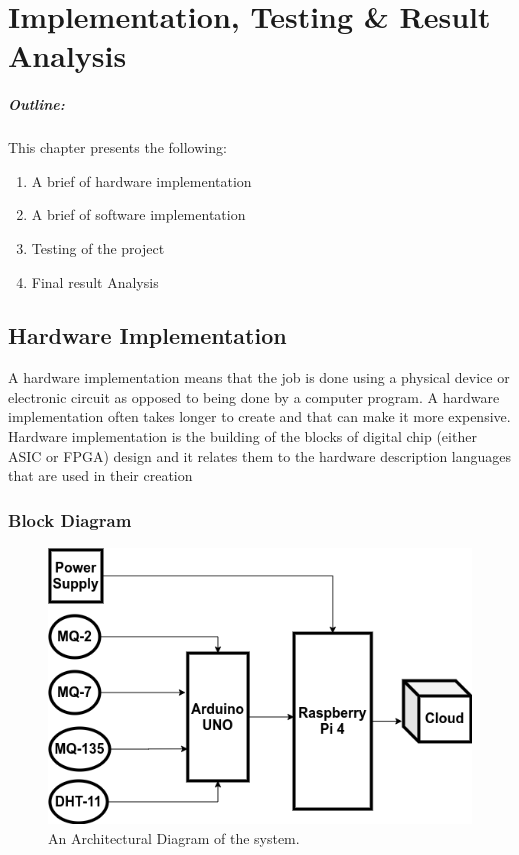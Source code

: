 

\chapter{Implementation, Testing \& Result Analysis}\label{chap4}



\vspace*{40 ex}
\paragraph*{Outline:} This chapter presents the following:
\begin{enumerate}
\setlength{\itemsep}{-0.3em}
\item A brief of hardware implementation
\item A brief of software implementation
\item Testing of the project
\item Final result Analysis
\end{enumerate}

\newpage

\section{Hardware Implementation}

A hardware implementation means that the job is done using a physical device or electronic circuit as opposed to being done by a computer program. A hardware implementation often takes longer to create and that can make it more expensive. Hardware implementation is the building of the blocks of digital chip (either ASIC or FPGA) design and it relates them to the hardware description languages that are used in their creation

\subsection{Block Diagram}

\begin{figure}[!ht]
\centering
\includegraphics[width=\linewidth]{figures/arc-diagram.png}
\caption{\label{img41} An Architectural Diagram of the system.}
\end{figure}


